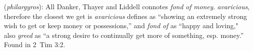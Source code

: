 \item[Moneyphile,]

(\textit{philargyros}):
All Danker, Thayer and Liddell connotes \emph{fond of money}. \emph{avaricious}, therefore the closest we get is \emph{avaricious} defines as ``showing an extremely strong wish to get or keep money or possessions,'' and \emph{fond of} as ``happy and loving," also \emph{greed} as ``a strong desire to continually get more of something, esp. money.''
Found in 2~Tim 3:2.
